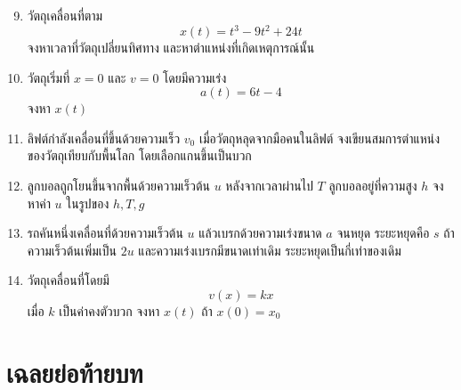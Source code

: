 \begin{enumerate}
    \setcounter{enumi}{8}
    \item วัตถุเคลื่อนที่ตาม
    \[
    x(t)=t^3-9t^2+24t
    \]
    จงหาเวลาที่วัตถุเปลี่ยนทิศทาง และหาตำแหน่งที่เกิดเหตุการณ์นั้น

    \item วัตถุเริ่มที่ $x=0$ และ $v=0$ โดยมีความเร่ง
    \[
    a(t)=6t-4
    \]
    จงหา $x(t)$

    \item ลิฟต์กำลังเคลื่อนที่ขึ้นด้วยความเร็ว $v_0$ เมื่อวัตถุหลุดจากมือคนในลิฟต์ จงเขียนสมการตำแหน่งของวัตถุเทียบกับพื้นโลก โดยเลือกแกนขึ้นเป็นบวก

    \item ลูกบอลถูกโยนขึ้นจากพื้นด้วยความเร็วต้น $u$ หลังจากเวลาผ่านไป $T$ ลูกบอลอยู่ที่ความสูง $h$ จงหาค่า $u$ ในรูปของ $h,T,g$

    \item รถคันหนึ่งเคลื่อนที่ด้วยความเร็วต้น $u$ แล้วเบรกด้วยความเร่งขนาด $a$ จนหยุด ระยะหยุดคือ $s$ ถ้าความเร็วต้นเพิ่มเป็น $2u$ และความเร่งเบรกมีขนาดเท่าเดิม ระยะหยุดเป็นกี่เท่าของเดิม

    \item วัตถุเคลื่อนที่โดยมี
    \[
    v(x)=kx
    \]
    เมื่อ $k$ เป็นค่าคงตัวบวก จงหา $x(t)$ ถ้า $x(0)=x_0$
\end{enumerate}

\section{เฉลยย่อท้ายบท}

